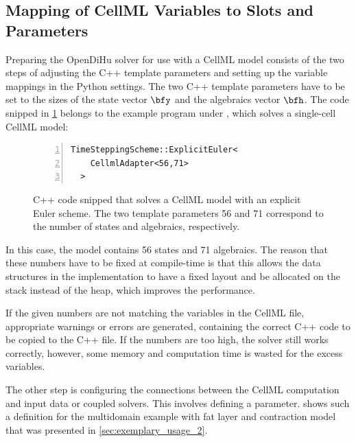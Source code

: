 \subsection{Mapping of CellML Variables to Slots and Parameters}

Preparing the OpenDiHu solver for use with a CellML model consists of the two steps of adjusting the C++ template parameters and setting up the variable mappings in the Python settings. The two C++ template parameters have to be set to the sizes of the state vector $\bfy$ and the algebraics vector $\bfh$. The code snipped in \cref{fig:example_shorten_cellml} belongs to the example program under , which solves a single-cell CellML model:
\begin{figure}[H]
\centering
\begin{framed}
\begin{lstlisting}[basicstyle=\small\ttfamily,commentstyle=\color{gray},numbers=left]
  TimeSteppingScheme::ExplicitEuler<
    CellmlAdapter<56,71>
  >
\end{lstlisting}
\end{framed}
\caption{C++ code snipped that solves a CellML model with an explicit Euler scheme. The two template parameters 56 and 71 correspond to the number of states and algebraics, respectively.}%
\label{fig:example_shorten_cellml}%
\end{figure}
In this case, the model contains 56 states and 71 algebraics. The reason that these numbers have to be fixed at compile-time is that this allows the data structures in the implementation to have a fixed layout and be allocated on the stack instead of the heap, which improves the performance.

If the given numbers are not matching the variables in the CellML file, appropriate warnings or errors are generated, containing the correct C++ code to be copied to the C++ file. If the numbers are too high, the solver still works correctly, however, some memory and computation time is wasted for the excess variables.

The other step is configuring the connections between the CellML computation and input data or coupled solvers. This involves defining a  parameter.  shows such a definition for the multidomain example with fat layer and contraction model that was presented in \cref{sec:exemplary_usage_2}.

